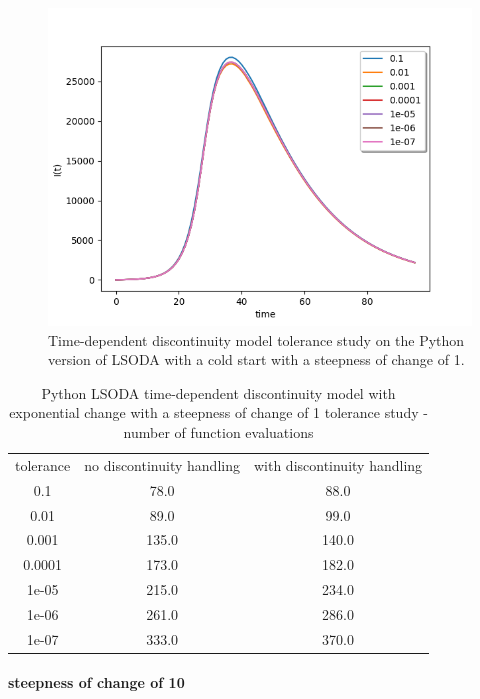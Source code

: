 \begin{figure}[H]
\centering
\includegraphics[width=0.7\linewidth]{./figures/exp_time_tol_lsoda_event_1}
\caption{Time-dependent discontinuity model tolerance study on the Python version of LSODA with a cold start with a steepness of change of 1.}
\label{fig:exp_time_tol_lsoda_event_1}
\end{figure}

\begin{table}[H]
\caption {Python LSODA time-dependent discontinuity model with exponential change with a steepness of change of 1 tolerance study - number of function evaluations} \label{tab:exp_time_tol_lsoda_1} 
\begin{center}
\begin{tabular}{ c c c }
tolerance & no discontinuity handling & with discontinuity handling \\ 
0.1 & 78.0 & 88.0 \\
0.01 & 89.0 & 99.0 \\
0.001 & 135.0 & 140.0 \\
0.0001 & 173.0 & 182.0 \\
1e-05 & 215.0 & 234.0 \\
1e-06 & 261.0 & 286.0 \\
1e-07 & 333.0 & 370.0 \\
\end{tabular}
\end{center}
\end{table}


\paragraph{steepness of change of 10}

